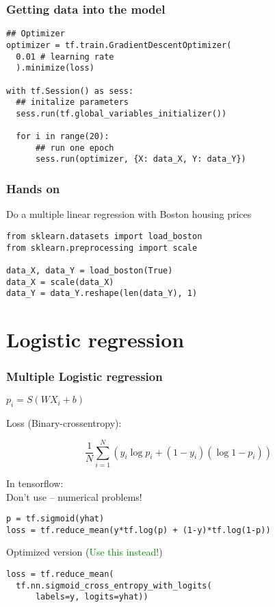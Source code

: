 \documentclass{beamer}
\begin{document}
\begin{frame}[fragile]
\frametitle{Getting data into the model}

\begin{lstlisting}
## Optimizer
optimizer = tf.train.GradientDescentOptimizer(
  0.01 # learning rate
  ).minimize(loss)

with tf.Session() as sess:
  ## initalize parameters
  sess.run(tf.global_variables_initializer())

  for i in range(20):
      ## run one epoch
      sess.run(optimizer, {X: data_X, Y: data_Y})
\end{lstlisting}
\end{frame}

\begin{frame}[fragile]
\frametitle{Hands on}

Do a multiple linear regression with Boston housing prices

\begin{lstlisting}
from sklearn.datasets import load_boston
from sklearn.preprocessing import scale

data_X, data_Y = load_boston(True)
data_X = scale(data_X)
data_Y = data_Y.reshape(len(data_Y), 1)
\end{lstlisting}
\end{frame}

\section{Logistic regression}

\begin{frame}[fragile]
\frametitle{Multiple Logistic regression}

$p_i = S(WX_i + b)$

Loss (Binary-crossentropy):

\[\frac{1}{N}\sum_{i=1}^N (y_i\log{p_i} + (1-y_i)(\log{1-p_i}))\]

In tensorflow:\\
\footnotesize{\textcolor{reduhh}{Don't use -- numerical problems!}}

\begin{lstlisting}
p = tf.sigmoid(yhat)
loss = tf.reduce_mean(y*tf.log(p) + (1-y)*tf.log(1-p))
\end{lstlisting}

\pause

Optimized version (\footnotesize{\textcolor{green}{Use this instead!}})
\begin{lstlisting}
loss = tf.reduce_mean(
  tf.nn.sigmoid_cross_entropy_with_logits(
      labels=y, logits=yhat))
\end{lstlisting}

\end{frame}
\end{document}
